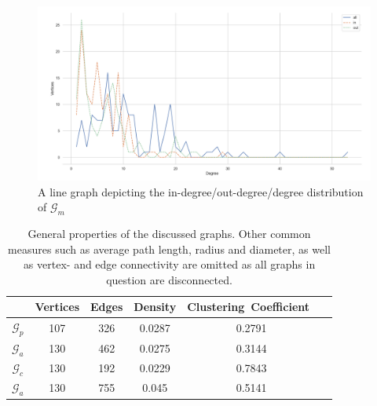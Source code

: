 \documentclass[11pt,a4paper]{book}
\theoremstyle{definition}
\theoremstyle{definition}
\theoremstyle{definition}
\theoremstyle{remark}
\newcommand{\pgraph}{\mathcal{G}_{p}}
\newcommand{\agraph}{\mathcal{G}_{a}}
\newcommand{\cgraph}{\mathcal{G}_{c}}
\newcommand{\acgraph}{\mathcal{G}_{m}}
\begin{document}
\begin{figure}[h]
\includegraphics[width=\textwidth]{acgraph_degree_distribution.png}
\caption{A line graph depicting the in-degree/out-degree/degree distribution of $\acgraph$}
\label{fig:cgraph-degree_distr}
\end{figure}



\begin{center}
\begin{table}
\small
\centering
\begin{tabular}{c| c c c c c}
\toprule
{} &  Vertices & Edges  &  Density & Clustering\ Coefficient\ \\
\midrule
$\pgraph$ & 107  & 326 &  0.0287 &  0.2791 \\
$\agraph$  & 130  & 462 &   0.0275 &  0.3144 \\
$\cgraph$  & 130  & 192 &  0.0229 &  0.7843 \\
$\agraph$  & 130  & 755 & 0.045 &  0.5141 \\
\bottomrule
\end{tabular}
\caption{General properties of the discussed graphs. Other common measures such as average path length, radius and diameter, as well as vertex- and edge connectivity are omitted as all graphs in question are disconnected.} 
\label{tab:graph-stat}
\end{table}
\end{center}
\end{document}
